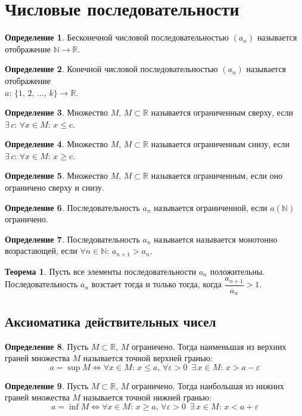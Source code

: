 \documentclass[12pt]{article}
\theoremstyle{definition}
\newtheorem{theorem}{Теорема}[section]
\newtheorem{definition}{Определение}
\newcommand{\N}{\mathbb{N}}
\newcommand{\R}{\mathbb{R}}
\begin{document}
\section{Числовые последовательности}
\begin{definition}
    Бесконечной числовой последовательностью $(a_n)$ называется отображение $\N \to \R$.
\end{definition}
\begin{definition}
    Конечной числовой последовательностью $(a_n)$ называется отображение\\ $a:\,\{1,\,2,\,\ldots,\,k\}\to \R$.
\end{definition}

\begin{definition}
    Множество $M,\,M\subset\R$ называется ограниченным сверху, если $\exists\, c:\,\forall x\in M:\,x \leq c$.
\end{definition}
\begin{definition}
    Множество $M,\,M\subset\R$ называется ограниченным снизу, если $\exists\, c:\,\forall x\in M:\,x \geq c$.
\end{definition}
\begin{definition}
    Множество $M,\,M\subset\R$ называется ограниченным, если оно ограничено сверху и снизу.
\end{definition}
\begin{definition}
    Последовательность $a_n$ называется ограниченной, если $a(\N)$ ограничено. 
\end{definition}
\begin{definition}
    Последовательность $a_n$ называется называется монотонно возрастающей, если $\forall n \in \N:\, a_{n+1}>a_n$.
\end{definition}
\begin{theorem}
    Пусть все элементы последовательности $a_n$ положительны. Последовательность $a_n$ возстает тогда и только тогда, когда $\dfrac{a_{n+1}}{a_n}>1$.
\end{theorem}

\subsection{Аксиоматика действительных чисел}

\begin{definition}
    Пусть $M \subset \R,\,M$ ограничено. Тогда наименьшая из верхних граней множества $M$ называется точной верхней гранью:
    $$a=\sup M\Longleftrightarrow \forall x \in M:\, x \leq a,\, \forall \varepsilon>0\,\,\, \exists\, x \in M:\, x>a-\varepsilon$$
\end{definition}
\begin{definition}
    Пусть $M \subset \R,\,M$ ограничено. Тогда наибольшая из нижних граней множества $M$ называется точной нижней гранью:
    $$a=\inf M\Longleftrightarrow \forall x \in M:\, x \geq a,\, \forall \varepsilon>0\,\,\, \exists\, x \in M:\, x<a+\varepsilon$$
\end{definition}
\end{document}
